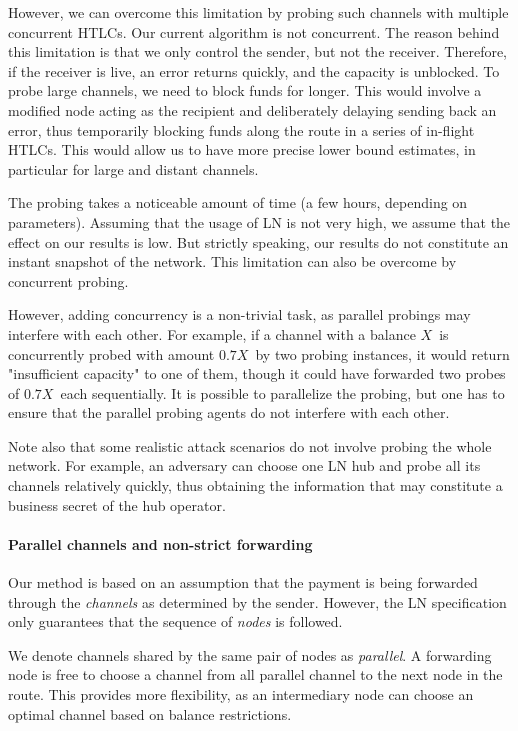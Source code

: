 However, we can overcome this limitation by probing such channels with multiple concurrent HTLCs.
Our current algorithm is not concurrent.
The reason behind this limitation is that we only control the sender, but not the receiver.
Therefore, if the receiver is live, an error returns quickly, and the capacity is unblocked.
To probe large channels, we need to block funds for longer.
This would involve a modified node acting as the recipient and deliberately delaying sending back an error, thus temporarily blocking funds along the route in a series of in-flight HTLCs.
This would allow us to have more precise lower bound estimates, in particular for large and distant channels.

The probing takes a noticeable amount of time (a few hours, depending on parameters).
Assuming that the usage of LN is not very high, we assume that the effect on our results is low.
But strictly speaking, our results do not constitute an instant snapshot of the network.
This limitation can also be overcome by concurrent probing.

However, adding concurrency is a non-trivial task, as parallel probings may interfere with each other.
For example, if a channel with a balance $X$~is concurrently probed with amount $0.7X$~by two probing instances, it would return "insufficient capacity" to one of them, though it could have forwarded two probes of $0.7X$~each sequentially.
It is possible to parallelize the probing, but one has to ensure that the parallel probing agents do not interfere with each other.

Note also that some realistic attack scenarios do not involve probing the whole network.
For example, an adversary can choose one LN hub and probe all its channels relatively quickly, thus obtaining the information that may constitute a business secret of the hub operator.

\paragraph{Parallel channels and non-strict forwarding}

Our method is based on an assumption that the payment is being forwarded through the \textit{channels} as determined by the sender.
However, the LN specification only guarantees that the sequence of \textit{nodes} is followed.

We denote channels shared by the same pair of nodes as \textit{parallel}.
A forwarding node is free to choose a channel from all parallel channel to the next node in the route.
This provides more flexibility, as an intermediary node can choose an optimal channel based on balance restrictions.

